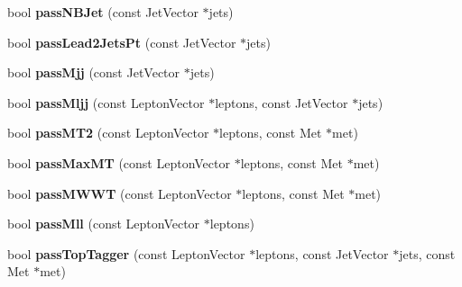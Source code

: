 \begin{DoxyCompactItemize}
\item 
\hypertarget{classSusySelection_a913b23f64f3dc18851fa309e4f955a90}{
bool {\bfseries passNBJet} (const JetVector $\ast$jets)}
\label{classSusySelection_a913b23f64f3dc18851fa309e4f955a90}

\item 
\hypertarget{classSusySelection_ac38c65729b8c8314e66761b8b41b3e87}{
bool {\bfseries passLead2JetsPt} (const JetVector $\ast$jets)}
\label{classSusySelection_ac38c65729b8c8314e66761b8b41b3e87}

\item 
\hypertarget{classSusySelection_ab3e66b5ecc7e4957ea6778ba8884ff52}{
bool {\bfseries passMjj} (const JetVector $\ast$jets)}
\label{classSusySelection_ab3e66b5ecc7e4957ea6778ba8884ff52}

\item 
\hypertarget{classSusySelection_a0ee9082c587a1747bb12f9d2fe5a95d8}{
bool {\bfseries passMljj} (const LeptonVector $\ast$leptons, const JetVector $\ast$jets)}
\label{classSusySelection_a0ee9082c587a1747bb12f9d2fe5a95d8}

\item 
\hypertarget{classSusySelection_aec6048d2b882a6592e03c95a7c6144cb}{
bool {\bfseries passMT2} (const LeptonVector $\ast$leptons, const Met $\ast$met)}
\label{classSusySelection_aec6048d2b882a6592e03c95a7c6144cb}

\item 
\hypertarget{classSusySelection_a83e7386477839c9bdbb5179c4de2e247}{
bool {\bfseries passMaxMT} (const LeptonVector $\ast$leptons, const Met $\ast$met)}
\label{classSusySelection_a83e7386477839c9bdbb5179c4de2e247}

\item 
\hypertarget{classSusySelection_a62ba113cdd5089283e8fa2a0fc134b73}{
bool {\bfseries passMWWT} (const LeptonVector $\ast$leptons, const Met $\ast$met)}
\label{classSusySelection_a62ba113cdd5089283e8fa2a0fc134b73}

\item 
\hypertarget{classSusySelection_a4119c6302771d707451db0a60c3fd735}{
bool {\bfseries passMll} (const LeptonVector $\ast$leptons)}
\label{classSusySelection_a4119c6302771d707451db0a60c3fd735}

\item 
\hypertarget{classSusySelection_a0f1055afeb5e2b1579f8ac6418f8d0cf}{
bool {\bfseries passTopTagger} (const LeptonVector $\ast$leptons, const JetVector $\ast$jets, const Met $\ast$met)}
\label{classSusySelection_a0f1055afeb5e2b1579f8ac6418f8d0cf}


\end{DoxyCompactItemize}
